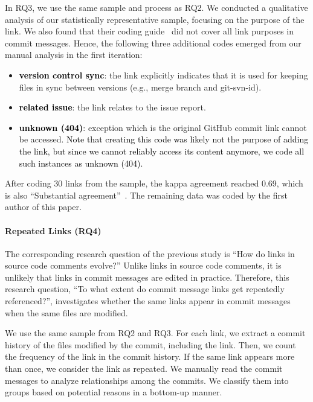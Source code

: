 \documentclass[smallextended]{svjour3}       %
\newcommand{\fix}[1]{\textcolor{black}{#1}}
\newcommand{\minor}[1]{\textcolor{black}{#1}}
\begin{document}
In RQ3, we use the same sample and process as RQ2. We conducted a qualitative analysis of our statistically representative sample, focusing on the purpose of the link. We also found that their coding guide~\citep{hata20199} did not cover all link purposes in commit messages. Hence, the following three additional codes emerged from our manual analysis in the first iteration:
\begin{itemize}
\item \fix{\textbf{version control sync}}: the link explicitly indicates that it is used for keeping files in sync between versions (e.g., merge branch and git-svn-id).
\item \fix{\textbf{related issue}}: the link relates to the issue report.
\item \fix{\minor{\textbf{unknown (404)}}}: exception which is the original GitHub commit link cannot be accessed. \fix{Note that creating \minor{this} code was likely not the purpose of adding the link, but since we cannot reliably access its content anymore, we code all such instances as \minor{unknown (404)}.}
\end{itemize}

After coding 30 links from the sample, the kappa agreement reached 0.69, which is also ``Substantial agreement''~\citep{viera2005understanding}. The remaining data was coded by the first author of this paper.

\paragraph{Repeated Links (RQ4)}
The corresponding research question of the previous study \citep{hata20199} is ``How do links in source code comments evolve?''
Unlike links in source code comments, it is unlikely that links in commit messages are edited in practice. Therefore, this research question, ``To what extent do commit message links get repeatedly referenced?'', investigates whether the same links appear in commit messages when the same files are modified.

We use the same sample from RQ2 and RQ3. For each link, we extract a commit history of the files modified by the commit, including the link.
Then, we count the frequency of the link in the commit history.
If the same link appears more than once, we consider the link
as repeated. We manually read the commit messages to analyze relationships among the commits. We classify them into groups based on potential reasons in a bottom-up manner.
\end{document}
